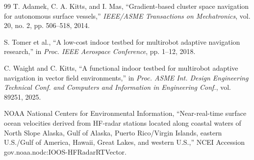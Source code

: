 \documentclass[lettersize,journal]{IEEEtran}
\begin{document}
\begin{thebibliography}{99}
 T. Adamek, C. A. Kitts, and I. Mas, ``Gradient-based cluster space
navigation for autonomous surface vessels,'' \textit{IEEE/ASME Transactions on
Mechatronics}, vol. 20, no. 2, pp. 506--518, 2014.

 S. Tomer et al., ``A low-cost indoor testbed for multirobot
adaptive navigation research,'' in \textit{Proc. IEEE Aerospace Conference},
pp. 1--12, 2018.

 C. Waight and C. Kitts, ``A functional indoor testbed for
multirobot adaptive navigation in vector field environments,'' in
\textit{Proc. ASME Int. Design Engineering Technical Conf. and Computers
and Information in Engineering Conf.}, vol. 89251, 2025.

 NOAA National Centers for Environmental Information,
``Near-real-time surface ocean velocities derived from HF-radar stations
located along coastal waters of North Slope Alaska, Gulf of Alaska,
Puerto Rico/Virgin Islands, eastern U.S./Gulf of America, Hawaii, Great
Lakes, and western U.S.,'' NCEI Accession
gov.noaa.nodc:IOOS-HFRadarRTVector.

\end{thebibliography}
\end{document}
